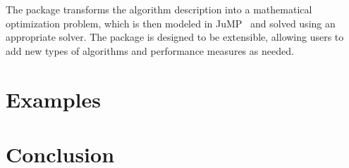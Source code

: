 \documentclass{juliacon}
\begin{document}
The package transforms the algorithm description into a mathematical optimization problem, which is then modeled in JuMP~\cite{JuMP,JuMP-review} and solved using an appropriate solver. The package is designed to be extensible, allowing users to add new types of algorithms and performance measures as needed.

\section{Examples}

\section{Conclusion}




\end{document}

